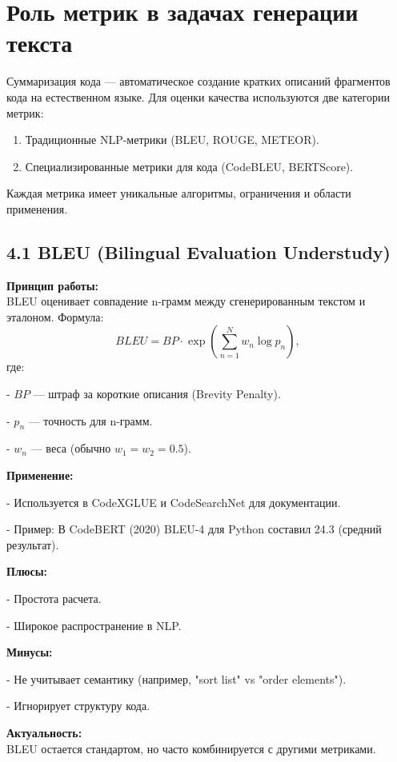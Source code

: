 \newpage
\section*{Роль метрик в задачах генерации текста}

Суммаризация кода — автоматическое создание кратких описаний фрагментов кода на естественном языке. Для оценки качества используются две категории метрик:

\begin{enumerate}
    \item Традиционные NLP-метрики (BLEU, ROUGE, METEOR).
    \item Специализированные метрики для кода (CodeBLEU, BERTScore).
\end{enumerate}

Каждая метрика имеет уникальные алгоритмы, ограничения и области применения.

\subsection*{4.1 BLEU (Bilingual Evaluation Understudy)}

\textbf{Принцип работы:} \\
BLEU оценивает совпадение n-грамм между сгенерированным текстом и эталоном. Формула:
\[
BLEU = BP \cdot \exp\left(\sum_{n=1}^{N} w_n \log p_n\right),
\]
где:

    
- $BP$ — штраф за короткие описания (Brevity Penalty).
    
- $p_n$ — точность для n-грамм.
    
- $w_n$ — веса (обычно $w_1 = w_2 = 0.5$).


\textbf{Применение:}

    
- Используется в CodeXGLUE и CodeSearchNet для документации.
    
- Пример: В CodeBERT (2020) BLEU-4 для Python составил 24.3 (средний результат).


\textbf{Плюсы:}

    
- Простота расчета.
    
- Широкое распространение в NLP.


\textbf{Минусы:}

    
- Не учитывает семантику (например, "sort list" vs "order elements").
    
- Игнорирует структуру кода.


\textbf{Актуальность:} \\
BLEU остается стандартом, но часто комбинируется с другими метриками.

